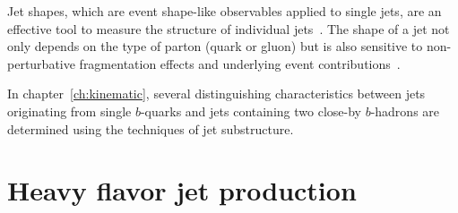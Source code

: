 Jet shapes, which are event shape-like observables applied to single jets, are an effective tool to measure the structure of individual jets~\cite{springerlink:10.1007/JHEP11(2010)101}.%
 The shape of a jet not only depends on the type of parton (quark or gluon) but is also sensitive to non-perturbative fragmentation effects and underlying event contributions~\cite{ATLASJetShapes}.




In chapter~\ref{ch:kinematic}, several distinguishing characteristics between jets originating from single $b$-quarks and jets containing two close-by  $b$-hadrons are determined using the techniques of jet substructure. 







\section{Heavy flavor jet production}%

